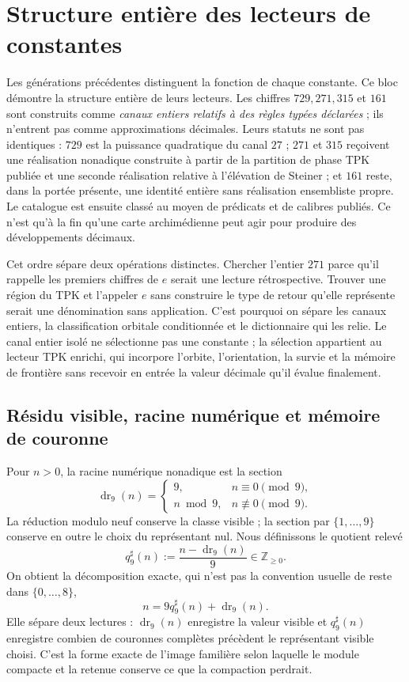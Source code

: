\chapter{Structure entière des lecteurs de constantes}
\label{chap:canales-enteros-constantes}

Les générations précédentes distinguent la fonction de chaque constante. Ce
bloc démontre la structure entière de leurs lecteurs. Les chiffres
\(729,271,315\) et \(161\) sont construits comme \emph{canaux entiers relatifs
à des règles typées déclarées} ; ils n'entrent pas comme approximations décimales. Leurs
statuts ne sont pas identiques : \(729\) est la puissance quadratique du canal
\(27\) ; \(271\) et \(315\) reçoivent une réalisation nonadique construite à partir de
la partition de phase TPK publiée et une seconde réalisation relative à l'élévation de
Steiner ; et
\(161\) reste, dans la portée présente, une identité entière sans
réalisation ensembliste propre. Le catalogue est ensuite classé au moyen de
prédicats et de calibres publiés. Ce n'est qu'à la fin qu'une carte
archimédienne peut agir pour produire des développements décimaux.

Cet ordre sépare deux opérations distinctes. Chercher l'entier \(271\)
parce qu'il rappelle les premiers chiffres de \(e\) serait une lecture
rétrospective. Trouver une région du TPK et l'appeler \(e\) sans construire le
type de retour qu'elle représente serait une dénomination sans application. C'est pourquoi on
sépare les canaux entiers, la classification orbitale conditionnée et le
dictionnaire qui les relie. Le canal entier isolé ne sélectionne pas une
constante ; la sélection appartient au lecteur TPK enrichi, qui incorpore
l'orbite, l'orientation, la survie et la mémoire de frontière sans
recevoir en entrée la valeur décimale qu'il évalue finalement.

\section{Résidu visible, racine numérique et mémoire de couronne}

Pour \(n>0\), la racine numérique nonadique est la section
\[
 \operatorname{dr}_9(n)
 =\begin{cases}
 9,&n\equiv0\pmod9,\\
 n\bmod9,&n\not\equiv0\pmod9.
 \end{cases}
\]
La réduction modulo neuf conserve la classe visible ; la section par
\(\{1,\ldots,9\}\) conserve en outre le choix du représentant nul.
Nous définissons le quotient relevé
\[
 q_9^\sharp(n):=\frac{n-\operatorname{dr}_9(n)}9
 \in\mathbb Z_{\geq0}.
\]
On obtient la décomposition exacte, qui n'est pas la convention usuelle de reste
dans \(\{0,\ldots,8\}\),
\[
 n=9q_9^\sharp(n)+\operatorname{dr}_9(n).
\]
Elle sépare deux lectures : \(\operatorname{dr}_9(n)\) enregistre la valeur
visible et \(q_9^\sharp(n)\) enregistre combien de couronnes complètes précèdent le
représentant visible choisi. C'est la forme exacte de l'image
familière selon laquelle le module compacte et la retenue conserve ce que la
compaction perdrait.

